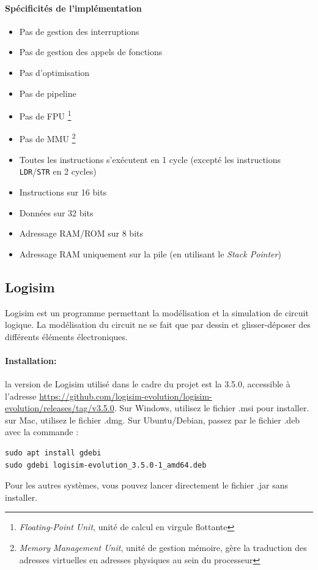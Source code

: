 \paragraph{Spécificités de l'implémentation}
\begin{itemize}
	\item Pas de gestion des interruptions
	\item Pas de gestion des appels de fonctions
	\item Pas d'optimisation
	\item Pas de pipeline
	\item Pas de FPU \footnote{\textit{Floating-Point Unit}, unité de calcul en virgule flottante}
	\item Pas de MMU \footnote{\textit{Memory Management Unit}, unité de gestion mémoire, gère la traduction des adresses virtuelles en adresses physiques au sein du processeur}
	\item Toutes les instructions s'exécutent en 1 cycle (excepté les instructions \texttt{LDR}/\texttt{STR} en 2 cycles)
	\item Instructions sur 16 bits
	\item Données sur 32 bits
	\item Adressage RAM/ROM sur 8 bits
	\item Adressage RAM uniquement sur la pile (en utilisant le \textit{Stack Pointer})
\end{itemize}

\subsection{Logisim}

Logisim est un programme permettant la modélisation et la simulation de circuit logique. La modélisation du circuit ne se fait que par dessin et glisser-déposer des différents éléments électroniques.

\paragraph{Installation:} la version de Logisim utilisé dans le cadre du projet est la 3.5.0, accessible à l'adresse \url{https://github.com/logisim-evolution/logisim-evolution/releases/tag/v3.5.0}. Sur Windows, utilisez le fichier .msi pour installer. sur Mac, utilisez le fichier .dmg. Sur Ubuntu/Debian, passez par le fichier .deb avec la commande :
\begin{lstlisting}
sudo apt install gdebi
sudo gdebi logisim-evolution_3.5.0-1_amd64.deb
\end{lstlisting}
Pour les autres systèmes, vous pouvez lancer directement le fichier .jar sans installer.


